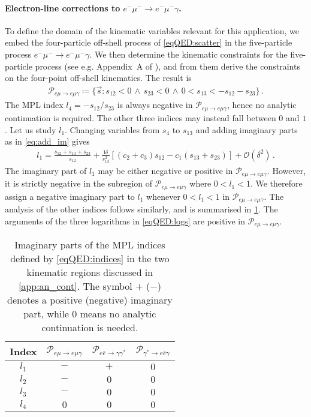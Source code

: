 \documentclass[main.tex]{subfiles}
\begin{document}
\smallskip

\paragraph{Electron-line corrections to $e^- \mu^- \to e^- \mu^- \gamma$.}
To define the domain of the kinematic variables relevant for this application, 
we embed the four-particle off-shell process of \cref{eqQED:scatter} in the five-particle process $e^- \mu^- \to e^- \mu^- \gamma$. We then determine the kinematic constraints for the five-particle process (see e.g. Appendix~A of ), and from them derive the constraints on the four-point off-shell kinematics. The result is
\begin{align}
\label{eq:region_emu-emugamma}
\mathcal{P}_{e\mu\to{e}\mu\gamma} \coloneqq \{\vec{s} \colon s_{12} < 0 \, \land \, s_{23} < 0 \, \land \, 0 < s_{13} < -s_{12} - s_{23} \} \,.
\end{align}
The MPL index $l_4 = - s_{12}/s_{23}$ is always negative in $\mathcal{P}_{{e}\mu\to{e}\mu\gamma}$, hence no analytic continuation is required. The other three indices may instead fall between $0$ and $1$. Let us study $l_1$. Changing variables from $s_4$ to $s_{13}$ and adding imaginary parts as in \cref{eq:add_im} gives
\begin{align}
l_1 = \frac{s_{12} + s_{13} + s_{23}}{s_{12}} +  \frac{\mathrm{i} \delta}{s_{12}^2} \left[ (c_2 + c_3) s_{12} - c_1 (s_{13} + s_{23}) \right] + \mathcal{O}\left(\delta^2\right) \,.
\end{align}
The imaginary part of $l_1$ may be either negative or positive in $\mathcal{P}_{{e}\mu\to{e}\mu\gamma} $. However, it is strictly negative in the subregion of $\mathcal{P}_{{e}\mu\to{e}\mu\gamma} $ where $0<l_1<1$. We therefore assign a negative imaginary part to $l_1$ whenever $0<l_1<1$ in $\mathcal{P}_{{e}\mu\to{e}\mu\gamma} $. The analysis of the other indices follows similarly, and is summarised in \cref{tab:an_cont}.
The arguments of the three logarithms in \cref{eqQED:logs} are positive in $\mathcal{P}_{e\mu\to{e}\mu\gamma}$.

\begin{table}
    \centering
    \begin{tabular}{cccc}
        \hline
        Index & $\mathcal{P}_{{e}\mu\to{e}\mu\gamma}$ & $\mathcal{P}_{{e}\bar{{e}}\to\gamma \gamma^*}$ & $\mathcal{P}_{\gamma^*\to e \bar{e} \gamma}$  \\
        \hline
        $l_1$  & $-$ & $+$ & $0$ \\
        $l_2$  & $-$ & $0$ & $0$ \\
        $l_3$  & $-$ & $0$ & $0$ \\
        $l_4$  & $0$ & $0$ & $0$ \\
        \hline
    \end{tabular}
    \caption{Imaginary parts of the MPL indices defined by \cref{eqQED:indices} in the two kinematic regions discussed in \cref{app:an_cont}. The symbol $+$ ($-$) denotes a positive (negative) imaginary part, while $0$ means no analytic continuation is needed.}
    \label{tab:an_cont}
\end{table}
\end{document}
